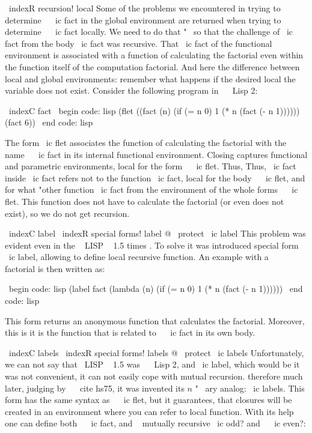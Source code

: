 \ indexR {recursion! local}
Some of the problems we encountered in trying to determine ~ \ ic {fact}
in the global environment are returned when trying to determine ~ \ ic {fact} locally.
We need to do that "~ so that the challenge of \ ic {fact} from the body \ ic {fact} was
recursive. That \ ic {fact} of the functional environment is associated
with a function of calculating the factorial even within the function itself of the computation
factorial. And here the difference between local and
global environments: remember what happens if the desired local
the variable does not exist. Consider the following program in ~ \ Lisp 2:

\ indexC {fact}
\ begin {code: lisp}
(flet ((fact (n) (if (= n 0) 1
                     (* n (fact (- n 1))))))
  (fact 6))
\ end {code: lisp}

The form \ ic {flet} associates the function of calculating the factorial with the name ~ \ ic {fact}
in its internal functional environment. Closing captures
functional and parametric environments, local for the form ~ \ ic {flet}. Thus,
Thus, \ ic {fact} inside \ ic {fact} refers not to the function \ ic {fact}, local
for the body ~ \ ic {flet}, and for what "other function \ ic {fact} from the environment of the whole
forms ~ \ ic {flet}. This function does not have to calculate the factorial (or even
does not exist), so we do not get recursion.

\ indexC {label}
\ indexR {special forms! label @ \ protect \ ic {label}}
This problem was evident even in the ~ LISP ~ 1.5 times . To solve it was introduced
special form ~ \ ic {label}, allowing to define local recursive
function. An example with a ~ factorial is then written as:

\ begin {code: lisp}
(label fact (lambda (n) (if (= n 0) 1
                            (* n (fact (- n 1))))))
\ end {code: lisp}

This form returns an anonymous function that calculates the factorial. Moreover, this is
it is the function that is related to ~ \ ic {fact} in its own body.

\ indexC {labels}
\ indexR {special forms! labels @ \ protect \ ic {labels}}
Unfortunately, we can not say that \ LISP ~ 1.5 was ~ \ Lisp 2, and \ ic {label}, which would be
it was not convenient, it can not easily cope with mutual recursion. therefore
much later, judging by ~ \ cite {hs75}, it was invented its $ n $ "~ ary analog:
\ ic {labels}. This form has the same syntax as ~ \ ic {flet}, but it guarantees,
that closures will be created in an environment where you can refer to local
function. With its help one can define both ~ \ ic {fact}, and ~ mutually recursive
\ ic {odd?} and ~ \ ic {even?}:

